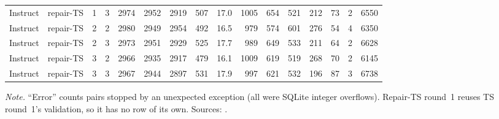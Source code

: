 \begin{landscape}
{\begin{longtable}{@{}llccrrrrrrrrrrrr@{}}
Instruct & repair-TS & 1 & 3 & 2974 & 2952 & 2919 & 507 & 17.0 & 1005 & 654 & 521 & 212 & 73 & 2 & 6550\\
Instruct & repair-TS & 2 & 2 & 2980 & 2949 & 2954 & 492 & 16.5 & 979 & 574 & 601 & 276 & 54 & 4 & 6350\\
Instruct & repair-TS & 2 & 3 & 2973 & 2951 & 2929 & 525 & 17.7 & 989 & 649 & 533 & 211 & 64 & 2 & 6628\\
Instruct & repair-TS & 3 & 2 & 2966 & 2935 & 2917 & 479 & 16.1 & 1009 & 619 & 519 & 268 & 70 & 2 & 6145\\
Instruct & repair-TS & 3 & 3 & 2967 & 2944 & 2897 & 531 & 17.9 & 997 & 621 & 532 & 196 & 87 & 3 & 6738\\
\end{longtable}
}
\vspace{-0.6\baselineskip}
{\footnotesize\color{slate}\textit{Note.} ``Error'' counts pairs stopped by an unexpected exception (all were SQLite integer overflows). Repair-TS round~1 reuses TS round~1's validation, so it has no row of its own. Sources: .\par}
\medskip
\end{landscape}
